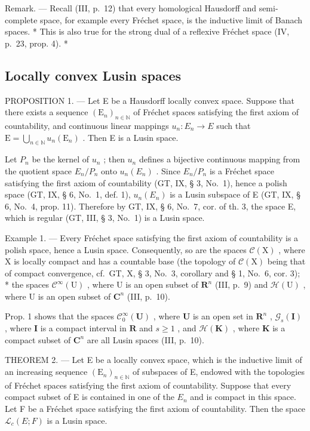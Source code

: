 Remark. --- Recall (III, p.~12) that every homological Hausdorff and semi-complete space, for example every Fréchet space, is the inductive limit of Banach spaces. * This is also true for the strong dual of a reflexive Fréchet space (IV, p.~23, prop. 4). *

\subsection{Locally convex Lusin spaces}

PROPOSITION 1. --- Let E be a Hausdorff locally convex space. Suppose that there exists a sequence \((\mathrm{E}_{n})_{n\in\mathbb{N}}\) of Fréchet spaces satisfying the first axiom of countability, and continuous linear mappings \(u_{n}:E_{n}\to E\) such that \(\mathrm{E}=\bigcup_{n\in\mathbb{N}}u_{n}(\mathrm{E}_{n})\) . Then E is a Lusin space.

Let \(P_n\) be the kernel of \(u_n\) ; then \(u_n\) defines a bijective continuous mapping from the quotient space \(E_n / P_n\) onto \(u_n(E_n)\) . Since \(E_n / P_n\) is a Fréchet space satisfying the first axiom of countability (GT, IX, § 3, No.~1), hence a polish space (GT, IX, § 6, No.~1, def. 1), \(u_n(E_n)\) is a Lusin subspace of E (GT, IX, § 6, No.~4, prop. 11). Therefore by GT, IX, § 6, No.~7, cor. of th. 3, the space E, which is regular (GT, III, § 3, No.~1) is a Lusin space.

Example 1. --- Every Fréchet space satisfying the first axiom of countability is a polish space, hence a Lusin space. Consequently, so are the spaces \(\mathcal{C}(\mathrm{X})\) , where \(\mathrm{X}\) is locally compact and has a countable base (the topology of \(\mathcal{C}(\mathrm{X})\) being that of compact convergence, cf.~GT, X, § 3, No.~3, corollary and § 1, No.~6, cor. 3); * the spaces \(\mathcal{C}^{\infty}(\mathrm{U})\) , where U is an open subset of \(\mathbf{R}^{n}\) (III, p.~9) and \(\mathcal{H}(\mathrm{U})\) , where U is an open subset of \(\mathbf{C}^{n}\) (III, p.~10).

Prop. 1 shows that the spaces \(\mathcal{C}_0^\infty (\mathbf{U})\) , where \(\mathbf{U}\) is an open set in \(\mathbf{R}^n\) , \(\mathcal{G}_s(\mathbf{I})\) , where \(\mathbf{I}\) is a compact interval in \(\mathbf{R}\) and \(s\geqslant 1\) , and \(\mathcal{H}(\mathbf{K})\) , where \(\mathbf{K}\) is a compact subset of \(\mathbf{C}^n\) are all Lusin spaces (III, p.~10).

THEOREM 2. --- Let E be a locally convex space, which is the inductive limit of an increasing sequence \((\mathrm{E}_n)_{n\in \mathbb{N}}\) of subspaces of E, endowed with the topologies of Fréchet spaces satisfying the first axiom of countability. Suppose that every compact subset of E is contained in one of the \(E_{n}\) and is compact in this space. Let F be a Fréchet space satisfying the first axiom of countability. Then the space \(\mathcal{L}_{c}(E;F)\) is a Lusin space.


